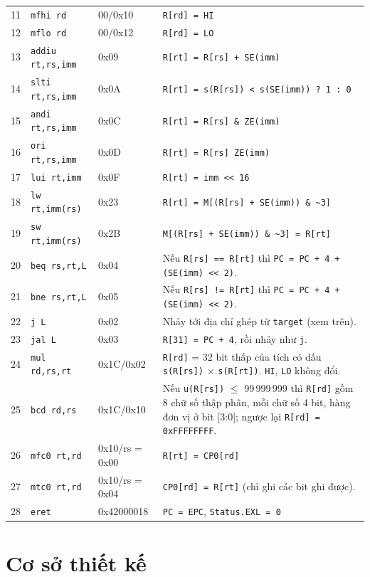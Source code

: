{\begin{longtable}{@{}r p{3.6cm} l p{6.1cm}@{}}
11 & \texttt{mfhi rd} & 00/0x10 & \texttt{R[rd] = HI} \\
12 & \texttt{mflo rd} & 00/0x12 & \texttt{R[rd] = LO} \\
13 & \texttt{addiu rt,rs,imm} & 0x09 & \texttt{R[rt] = R[rs] + SE(imm)} \\
14 & \texttt{slti rt,rs,imm} & 0x0A & \texttt{R[rt] = s(R[rs]) < s(SE(imm)) ? 1 : 0} \\
15 & \texttt{andi rt,rs,imm} & 0x0C & \texttt{R[rt] = R[rs] \& ZE(imm)} \\
16 & \texttt{ori rt,rs,imm} & 0x0D & \texttt{R[rt] = R[rs] \textbar{} ZE(imm)} \\
17 & \texttt{lui rt,imm} & 0x0F & \texttt{R[rt] = imm {<}{<} 16} \\
18 & \texttt{lw rt,imm(rs)} & 0x23 & \texttt{R[rt] = M[(R[rs] + SE(imm)) \& \~{}3]} \\
19 & \texttt{sw rt,imm(rs)} & 0x2B & \texttt{M[(R[rs] + SE(imm)) \& \~{}3] = R[rt]} \\
20 & \texttt{beq rs,rt,L} & 0x04 & Nếu \texttt{R[rs] == R[rt]} thì \texttt{PC = PC + 4 + (SE(imm) {<}{<} 2)}. \\
21 & \texttt{bne rs,rt,L} & 0x05 & Nếu \texttt{R[rs] != R[rt]} thì \texttt{PC = PC + 4 + (SE(imm) {<}{<} 2)}. \\
22 & \texttt{j L} & 0x02 & Nhảy tới địa chỉ ghép từ \texttt{target} (xem trên). \\
23 & \texttt{jal L} & 0x03 & \texttt{R[31] = PC + 4}, rồi nhảy như \texttt{j}. \\
24 & \texttt{mul rd,rs,rt} & 0x1C/0x02 & \texttt{R[rd]} = 32 bit thấp của tích có dấu \texttt{s(R[rs])} $\times$ \texttt{s(R[rt])}. \texttt{HI}, \texttt{LO} không đổi. \\
25 & \texttt{bcd rd,rs} & 0x1C/0x10 & Nếu \texttt{u(R[rs])} $\le$ 99\,999\,999 thì \texttt{R[rd]} gồm 8 chữ số thập phân, mỗi chữ số 4 bit, hàng đơn vị ở bit [3:0]; ngược lại \texttt{R[rd] = 0xFFFFFFFF}. \\
26 & \texttt{mfc0 rt,rd} & 0x10/rs = 0x00 & \texttt{R[rt] = CP0[rd]} \\
27 & \texttt{mtc0 rt,rd} & 0x10/rs = 0x04 & \texttt{CP0[rd] = R[rt]} (chỉ ghi các bit ghi được). \\
28 & \texttt{eret} & 0x42000018 & \texttt{PC = EPC}, \texttt{Status.EXL = 0} \\
\end{longtable}
}

\section{Cơ sở thiết kế}\label{sec:co-so-tk}
